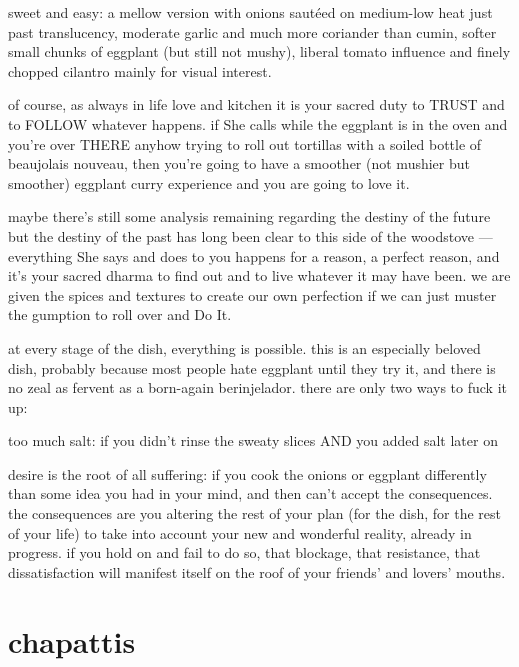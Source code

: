 sweet and easy: a mellow version with onions saut\'{e}ed on medium-low heat 
just past translucency, moderate garlic and much more coriander than cumin, 
softer small chunks of eggplant (but still not mushy), liberal tomato influence 
and finely chopped cilantro mainly for visual interest.

of course, as always in life love and kitchen it is your sacred duty to TRUST 
and to FOLLOW whatever happens. if She calls while the eggplant is in the oven 
and you're over THERE anyhow trying to roll out tortillas with a soiled bottle 
of beaujolais nouveau, then you're going to have a smoother (not mushier but 
smoother) eggplant curry experience and you are going to love it.

maybe there's still some analysis remaining regarding the destiny of the future 
but the destiny of the past has long been clear to this side of the woodstove 
--- everything She says and does to you happens for a reason, a perfect reason, 
and it's your sacred dharma to find out and to live whatever it may have been. 
we are given the spices and textures to create our own perfection if we can 
just muster the gumption to roll over and Do It.

at every stage of the dish, everything is possible. this is an especially 
beloved dish, probably because most people hate eggplant until they try it, and 
there is no zeal as fervent as a born-again berinjelador. there are only two 
ways to fuck it up:

\begin{ingredients}
  \item too much salt: if you didn't rinse the sweaty slices AND you added salt 
  later on
	
  \item desire is the root of all suffering: if you cook the onions or eggplant 
  differently than some idea you had in your mind, and then can't accept the 
  consequences. the consequences are you altering the rest of your plan (for 
  the dish, for the rest of your life) to take into account your new and 
  wonderful reality, already in progress. if you hold on and fail to do so, 
  that blockage, that resistance, that dissatisfaction will manifest itself on 
  the roof of your friends' and lovers' mouths.
\end{ingredients}

\section{chapattis}

